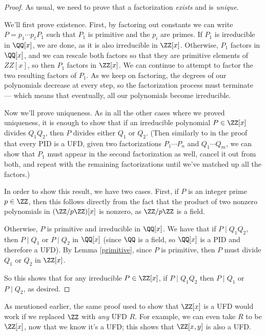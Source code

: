 \begin{proof}
As usual, we need to prove that a factorization \emph{exists} and is \emph{unique}. 

We'll first prove existence. First, by factoring out constants we can write $P = p_1\cdots p_{\ell} P_1$ such that $P_1$ is primitive and the $p_i$ are primes. If $P_1$ is irreducible in $\QQ[x]$, we are done, as it is also irreducible in $\ZZ[x]$. Otherwise, $P_1$ factors in $\QQ[x]$, and we can rescale both factors so that they are primitive elements of $ZZ[x]$, so then $P_1$ factors in $\ZZ[x]$. We can continue to attempt to factor the two resulting factors of $P_1$. As we keep on factoring, the degrees of our polynomials decrease at every step, so the factorization process must terminate --- which means that eventually, all our polynomials become irreducible. %
    
Now we'll prove uniqueness. As in all the other cases where we proved uniqueness, it is enough to show that if an irreducible polynomial $P \in \ZZ[x]$ divides $Q_1Q_2$, then $P$ divides either $Q_1$ or $Q_2$. (Then similarly to in the proof that every PID is a UFD, given two factorizations $P_1\cdots P_n$ and $Q_1\cdots Q_m$, we can show that $P_1$ must appear in the second factorization as well, cancel it out from both, and repeat with the remaining factorizations until we've matched up all the factors.)

In order to show this result, we have two cases. First, if $P$ is an integer prime $p \in \ZZ$, then this follows directly from the fact that the product of two nonzero polynomials in $(\ZZ/p\ZZ)[x]$ is nonzero, as $\ZZ/p\ZZ$ is a field. 
    
Otherwise, $P$ is primitive and irreducible in $\QQ[x]$. We have that if $P \mid Q_1Q_2$, then $P \mid Q_1$ or $P \mid Q_2$ in $\QQ[x]$ (since $\QQ$ is a field, so $\QQ[x]$ is a PID and therefore a UFD). By Lemma \ref{primitive}, since $P$ is primitive, then $P$ must divide $Q_1$ or $Q_2$ in $\ZZ[x]$. 

So this shows that for any irreducible $P \in \ZZ[x]$, if $P \mid Q_1Q_2$ then $P \mid Q_1$ or $P \mid Q_2$, as desired. 
\end{proof}

As mentioned earlier, the same proof used to show that $\ZZ[x]$ is a UFD would work if we replaced $\ZZ$ with \emph{any} UFD $R$. For example, we can even take $R$ to be $\ZZ[x]$, now that we know it's a UFD; this shows that $\ZZ[x, y]$ is also a UFD. 

